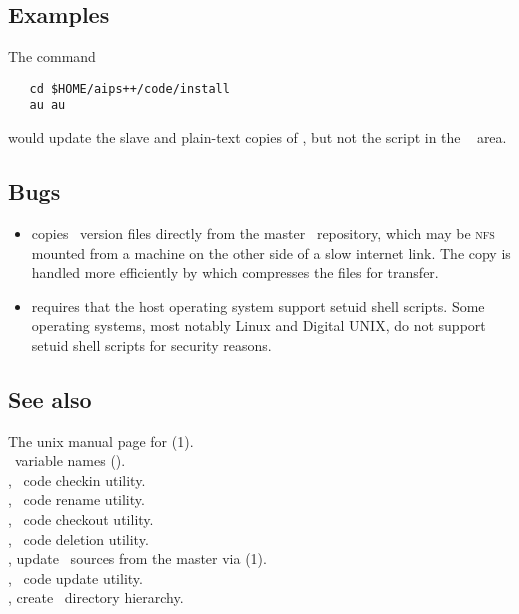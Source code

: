 \subsection*{Examples}

The command

\begin{verbatim}
   cd $HOME/aips++/code/install
   au au
\end{verbatim}

\noindent
would update the slave and plain-text copies of , but not the script
in the \aipspp\  area.

\subsection*{Bugs}
 
\begin{itemize}
\item
    copies \rcs\ version files directly from the master \rcs\
   repository, which may be \textsc{nfs} mounted from a machine on the other
   side of a slow internet link.  The copy is handled more efficiently by
   \exeref{rau} which compresses the files for transfer.

\item
    requires that the host operating system support setuid shell
   scripts.  Some operating systems, most notably Linux and Digital
   UNIX, do not support setuid shell scripts for security reasons.
\end{itemize}

\subsection*{See also}

The unix manual page for (1).\\
\aipspp\ variable names ().\\
, \aipspp\ code checkin utility.\\
, \aipspp\ code rename utility.\\
, \aipspp\ code checkout utility.\\
, \aipspp\ code deletion utility.\\
, update \aipspp\ sources from the master via (1).\\
\exeref{sau}, \aipspp\ code update utility.\\
, create \aipspp\ directory hierarchy.

